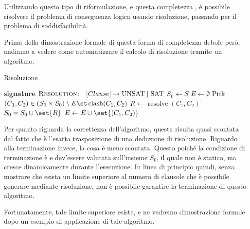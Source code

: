 Utilizzando questo tipo di riformulazione, e questa completezza , è possibile risolvere il problema di conseguenza logica usando risoluzione, passando per il problema di soddisfacibilità.

Prima della dimostrazione formale di questa forma di completezza debole però, andiamo a vedere come automatizzare il calcolo di risoluzione tramite un algoritmo.

\begin{algorithmdesc}{Risoluzione}
    \begin{algorithmic}[1]
      \Statex{} \textbf{signature} \(\textsc{Resolution:} \quad [Clause] \to \Unsat \mid \Sat\)
          \State{} \(S_0\gets S\)
          \State{} \(E \gets \emptyset\)
          \Repeat{}
            \State{} Pick \((C_1, C_2) \in (S_0 \times S_0)\setminus E \st \operatorname{clash}(C_1, C_2)\)
            \State{} \(R \gets \operatorname{resolve}(C_1, C_2)\)
              \State{} \(S_0 = S_0 \cup \set{R}\)
            \EndIf{}
            \State{} \(E \gets E \cup \set{(C_1, C_2)}\)
            \State{} \Return{\(\Unsat\)}
          \Else{}
            \State{} \Return{\(\Sat\)}
          \EndIf{}
      \EndFunction{}
    \end{algorithmic}
\end{algorithmdesc}

Per quanto riguarda la correttezza dell'algoritmo, questa risulta quasi scontata dal fatto che è l'esatta trasposizione di una deduzione di risoluzione. Riguardo alla terminazione invece, la cosa è meno scontata. Questo poiché la condizione di terminazione è e dev'essere valutata sull'insieme \(S_0\), il quale non è statico, ma cresce dinamicamente durante l'esecuzione. In linea di principio quindi, senza mostrare che esista un limite superiore al numero di clausole che è possibile generare mediante risoluzione, non è possibile garantire la terminazione di questo algoritmo.

Fortunatamente, tale limite superiore esiste, e ne vedremo dimostrazione formale dopo un esempio di applicazione di tale algoritmo.

